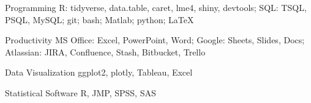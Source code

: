 

\begin{cvskills}

  \cvskill
    {Programming} %
    {R: tidyverse, data.table, caret, lme4, shiny, devtools; SQL: TSQL, PSQL, MySQL; git; bash; Matlab; python; \LaTeX} %

  \cvskill
    {Productivity} %
    {MS Office: Excel, PowerPoint, Word; Google: Sheets, Slides, Docs; Atlassian: JIRA, Confluence, Stash, Bitbucket, Trello} %

  \cvskill
    {Data Visualization} %
    {ggplot2, plotly, Tableau, Excel} %

  \cvskill
    {Statistical Software} %
    {R, JMP, SPSS, SAS} %

\end{cvskills}
